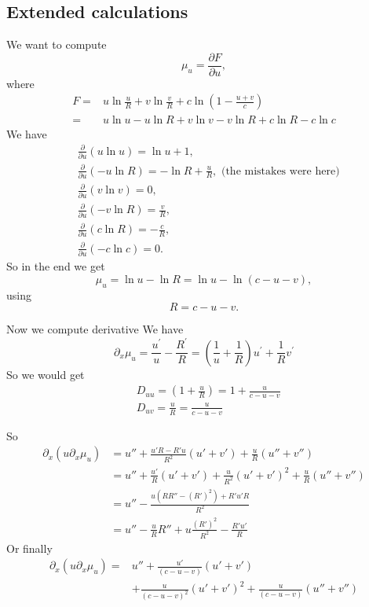 \documentclass{article}
\begin{document}
	\subsection{Extended calculations}
		We want to compute
	\begin{equation}\label{chemical-potential}
		\mu_{u}=\frac{\partial F}{\partial u},
	\end{equation}
where 
\begin{align}
	F=&u\ln\frac{u}{R}+v\ln\frac{v}{R}+c\ln\left(1-\frac{u+v}{c}\right)\\
	=&u\ln u-u\ln R+v\ln v-v\ln R+c\ln R - c \ln c
\end{align}
We have 
\begin{align*} 
	&\frac{\partial}{\partial u}\left(u \ln u\right) = \ln u + 1, \\ 
	&\frac{\partial}{\partial u}\left(-u \ln R\right) = -\ln R + \frac{u}{R},  \text{ (the mistakes were here)}\\ 
	&\frac{\partial}{\partial u}\left(v \ln v\right) = 0, \\ 
	&\frac{\partial}{\partial u}\left(-v \ln R\right) = \frac{v}{R}, \\ &\frac{\partial}{\partial u}\left(c \ln R\right) = -\frac{c}{R}, \\ &\frac{\partial}{\partial u}\left(-c \ln c\right) = 0. 
\end{align*} 
So in the end we get
\begin{equation}
	\mu_u = \ln u -\ln R = \ln u - \ln (c-u-v),
	\end{equation}	
	using 
	\begin{equation}
	R = c-u-v.
	\end{equation}

Now we compute derivative
We have
\begin{equation}
\partial_{x}\mu_{u}=\frac{u^{\prime}}{u}-\frac{R^{\prime}}{R}=\left(\frac{1}{u}+\frac{1}{R}\right)u^{\prime}+\frac{1}{R}v^{\prime}
\end{equation}
So we would get 
\begin{align}
&D_{uu}=(1+\frac{u}{R})=1+\frac{u}{c-u-v}\\
&D_{uv}=\frac{u}{R}=\frac{u}{c-u-v}
\end{align}

So 
\begin{align}\partial_x( u \partial_x \mu_u) &=u''+ \frac{u'R-R'u}{R^2}(u'+v')+\frac{u}{R}(u''+v'')\\
&=u''+\frac{u'}{R}(u'+v')+\frac{u}{R^2}(u'+v')^2+\frac{u}{R}(u''+v'')\\&=
u''-\frac{u(RR''-(R')^2)+R'u'R}{R^2}\\
&=u'' - \frac{u}{R}R'' + u\frac{(R')^2}{R^2}-\frac{R'u'}{R}
\end{align}
Or finally
\begin{align}
\partial_x( u \partial_x \mu_u)=&u''+\frac{u'}{(c-u-v)}(u'+v')\\&+\frac{u}{(c-u-v)^2}(u'+v')^2+\frac{u}{(c-u-v)}(u''+v'')
\end{align}
\end{document}
